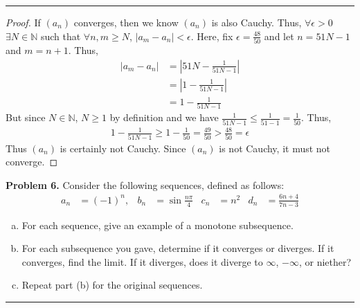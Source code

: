 \documentclass[leqno]{article}
\theoremstyle{nonumberplain}
\newtheorem{proof}{Proof}
\begin{document}
\noindent\rule[0.5ex]{\linewidth}{1pt}

\begin{proof}
If $(a_n)$ converges, then we know $(a_n)$ is also Cauchy.  Thus, $\forall \epsilon >0$ $\exists N \in \mathbb{N}$ such that $\forall n,m \geq N$, $|a_m - a_n| < \epsilon$. Here, fix $\epsilon = \frac{48}{50}$ and let $n=51N-1$ and $m=n+1$. Thus,
\begin{align*}
|a_m-a_n| &= \left|51N-\frac{1}{51N-1}\right|\\
& = \left|1-\frac{1}{51N-1}\right|\\
&=1-\frac{1}{51N-1}
\end{align*}
But since $N \in \mathbb{N}$, $N \geq 1$ by definition and we have $\frac{1}{51N-1}\leq \frac{1}{51-1}= \frac{1}{50}$. Thus,
\begin{align*}
1-\frac{1}{51N-1}\geq 1-\frac{1}{50} = \frac{49}{50} > \frac{48}{50} = \epsilon
\end{align*}
Thus $(a_n)$ is certainly not Cauchy.  Since $(a_n)$ is not Cauchy, it must not converge.
\end{proof}


\pagebreak




\noindent\textbf{Problem 6.} Consider the following sequences, defined as follows:
\begin{align*}
a_n &= (-1)^n , &		b_n &= \sin \frac{n \pi}{4} &		c_n &= n^2 &		d_n &= \frac{6n+4}{7n-3}
\end{align*}

\begin{enumerate}[(a)]
\item
For each sequence, give an example of a monotone subsequence.
\item
For each subsequence you gave, determine if it converges or diverges. If it converges, find the limit. If it diverges, does it diverge to $\infty$, $-\infty$, or niether?
\item
Repeat part (b) for the original sequences.
\end{enumerate}

\noindent\rule[0.5ex]{\linewidth}{1pt}
\end{document}
